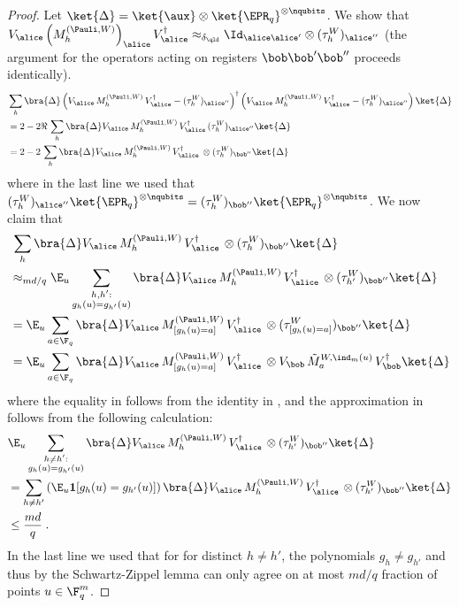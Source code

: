 \begin{proof}
	


Let $\ket{\Delta} = \ket{\aux} \otimes \ket{\EPR_q}^{\otimes \nqubits}$. We show that $V_\alice \, \Big(M^{(\Pauli,W)}_h \Big)_{\alice} \, V_\alice^\dagger \approx_{\delta_\qld} \Id_{\alice \alice'} \otimes (\tau^W_h)_{\alice''}$ (the argument for the operators acting on registers $\bob \bob' \bob''$ proceeds identically). 
	\begin{align}
		&\sum_h \bra{\Delta} \left ( V_\alice \, M^{(\Pauli,W)}_h \, V_\alice^\dagger - (\tau^W_h)_{\alice''}  \right)^\dagger \left ( V_\alice \, M^{(\Pauli,W)}_h \, V_\alice^\dagger - (\tau^W_h)_{\alice''} \right) \ket{\Delta} \notag \\
		&= 2 - 2 \Re \, \sum_h \bra{\Delta} V_\alice\, M^{(\Pauli,W)}_h \, V_\alice^\dagger  \, (\tau^W_h)_{\alice''} \ket{\Delta} \notag \\
		&= 2 - 2 \, \sum_h \bra{\Delta} V_\alice \, M^{(\Pauli,W)}_h \, V_\alice^\dagger  \, \otimes (\tau^W_h)_{\bob''} \ket{\Delta} \label{eq:qld-unitary-7}
\end{align}
	where in the last line we used that $(\tau^W_h)_{\alice''} \ket{\EPR_q}^{\otimes \nqubits} = (\tau^W_h)_{\bob''} \ket{\EPR_q}^{\otimes \nqubits}$.
	We now claim that
	\begin{align}
	&  \, \sum_h \bra{\Delta} V_\alice \, M^{(\Pauli,W)}_h \, V_\alice^\dagger  \, \otimes (\tau^W_h)_{\bob''} \ket{\Delta}  \notag \\
	&\approx_{md/q}  \E_u \sum_{\substack{h, h' : \\ g_h(u) = g_{h'}(u)}} \bra{\Delta} V_\alice \, M^{(\Pauli,W)}_h \, V_\alice^\dagger  \, \otimes (\tau^W_{h'})_{\bob''} \ket{\Delta} \label{eq:qld-unitary-8} \\
	&=  \E_u \sum_{a \in \F_q} \bra{\Delta} V_\alice \, M^{(\Pauli,W)}_{[g_h(u)=a]} \, V_\alice^\dagger \, \otimes (\tau^W_{[g_h(u)=a]})_{\bob''} \ket{\Delta} \notag \\
	&=  \E_u \sum_{a \in \F_q} \bra{\Delta} V_\alice \, M^{(\Pauli,W)}_{[g_h(u)=a]} \, V_\alice^\dagger \, \otimes V_\bob  \, \tilde{M}^{W,\ind_m(u)}_a \, V_\bob^\dagger \ket{\Delta} \label{eq:qld-unitary-9}
	\end{align}
	where the equality in  follows from the identity in , and the approximation in  follows from the following calculation:
	\begin{align*}
		& \E_u \sum_{\substack{h \neq h' : \\ g_h(u) = g_{h'}(u)}} \bra{\Delta} V_\alice \, M^{(\Pauli,W)}_h \, V_\alice^\dagger  \, \otimes (\tau^W_{h'})_{\bob''} \ket{\Delta}  \\
		&= \sum_{h \neq h'} \left( \E_u \mathbf{1}[g_h(u) = g_{h'}(u)] \right) \bra{\Delta} V_\alice \, M^{(\Pauli,W)}_h \, V_\alice^\dagger  \, \otimes (\tau^W_{h'})_{\bob''} \ket{\Delta} \\
		&\leq \frac{md}{q}\;.
	\end{align*}
	In the last line we used that for for distinct $h \neq h'$, the polynomials $g_h \neq g_{h'}$ and thus by the Schwartz-Zippel lemma can only agree on at most $md/q$ fraction of points $u \in \F_q^m$. 
	

\end{proof}
